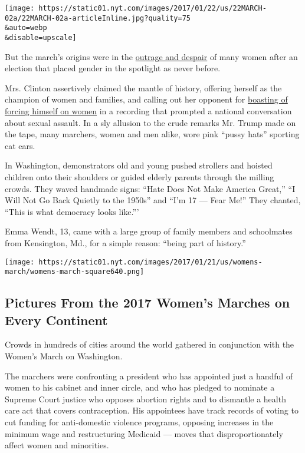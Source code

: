\texttt{[image: https://static01.nyt.com/images/2017/01/22/us/22MARCH-02a/22MARCH-02a-articleInline.jpg?quality=75\\\&auto=webp\\\&disable=upscale]}

But the march's origins were in the
\href{https://www.nytimes.com/2016/12/30/opinion/sunday/feminism-lost-now-what.html}{outrage
and despair} of many women after an election that placed gender in the
spotlight as never before.

Mrs. Clinton assertively claimed the mantle of history, offering herself
as the champion of women and families, and calling out her opponent for
\href{https://www.nytimes.com/2016/10/08/us/politics/donald-trump-women.html}{boasting
of forcing himself on women} in a recording that prompted a national
conversation about sexual assault. In a sly allusion to the crude
remarks Mr. Trump made on the tape, many marchers, women and men alike,
wore pink ``pussy hats'' sporting cat ears.

In Washington, demonstrators old and young pushed strollers and hoisted
children onto their shoulders or guided elderly parents through the
milling crowds. They waved handmade signs: ``Hate Does Not Make America
Great,'' ``I Will Not Go Back Quietly to the 1950s'' and ``I'm 17 ---
Fear Me!'' They chanted, ``This is what democracy looks like.'''

Emma Wendt, 13, came with a large group of family members and
schoolmates from Kensington, Md., for a simple reason: ``being part of
history.''

\href{https://www.nytimes.com/interactive/2017/01/21/world/womens-march-pictures.html}{}

\texttt{[image: https://static01.nyt.com/images/2017/01/21/us/womens-march/womens-march-square640.png]}

\hypertarget{pictures-from-the-2017-womens-marches-on-every-continent}{%
\subsection{Pictures From the 2017 Women's Marches on Every
Continent}\label{pictures-from-the-2017-womens-marches-on-every-continent}}

Crowds in hundreds of cities around the world gathered in conjunction
with the Women's March on Washington.

The marchers were confronting a president who has appointed just a
handful of women to his cabinet and inner circle, and who has pledged to
nominate a Supreme Court justice who opposes abortion rights and to
dismantle a health care act that covers contraception. His appointees
have track records of voting to cut funding for anti-domestic violence
programs, opposing increases in the minimum wage and restructuring
Medicaid --- moves that disproportionately affect women and minorities.


